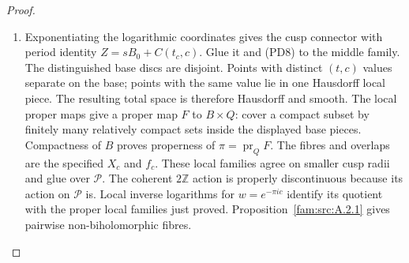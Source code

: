 \begin{proof}
\begin{enumerate}[label=\arabic*.,leftmargin=*]
\item Exponentiating the logarithmic coordinates gives the cusp
connector with period identity $Z=sB_0+C(t_c,c)$.
Glue it and (PD8) to the middle family. The distinguished base
discs are disjoint. Points with distinct $(t,c)$ values separate
on the base; points with the same value lie in one Hausdorff local
piece. The resulting total space is therefore Hausdorff and smooth.
The local proper maps give a proper map $F$ to $B\times Q$:
cover a compact subset by finitely many relatively compact sets
inside the displayed base pieces. Compactness of $B$ proves
properness of $\pi=\operatorname{pr}_QF$.
The fibres and overlaps are the specified $X_c$ and $f_c$.
These local families agree on smaller cusp radii and glue over
$\mathcal P$. The coherent $2\mathbb Z$ action is properly
discontinuous because its action on $\mathcal P$ is.
Local inverse logarithms for $w=e^{-\pi ic}$ identify its quotient
with the proper local families just proved.
Proposition~\ref{fam:src:A.2.1} gives pairwise non-biholomorphic fibres.
\end{enumerate}
\end{proof}

